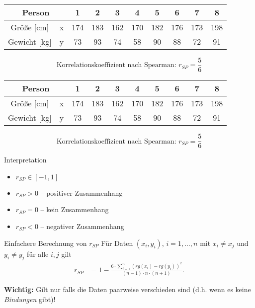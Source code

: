 \documentclass[t,11pt]{beamer}
\begin{document}
\begin{frame}
\begin{tabular}{|cc|cccccccc|}
	\hline
	\multicolumn{2}{|c|}{Person} & 1 & 2 & 3 & 4 & 5 & 6 & 7 & 8 \\
	\hline 
	Größe [cm] & x & 174 & 183 & 162  & 170 & 182 & 176 & 173 & 198  \\ 
	Gewicht [kg] & y &  73 & 93 & 74 & 58 & 90 & 88 & 72 & 91\\ 
	\hline 
\end{tabular}
$$\text{Korrelationskoeffizient nach Spearman: }r_{SP}=\frac{5}{6}$$
\end{frame}

\begin{frame}
\begin{tabular}{|cc|cccccccc|}
	\hline
	\multicolumn{2}{|c|}{Person} & 1 & 2 & 3 & 4 & 5 & 6 & 7 & 8 \\
	\hline 
	Größe [cm] & x & 174 & 183 & 162  & 170 & 182 & 176 & 173 & 198  \\ 
	Gewicht [kg] & y &  73 & 93 & 74 & 58 & 90 & 88 & 72 & 91\\ 
	\hline 
\end{tabular}
$$\text{Korrelationskoeffizient nach Spearman: }r_{SP}=\frac{5}{6}$$
\begin{alertblock}{Interpretation}
	\begin{itemize}
		\item $r_{SP} \in [-1,1]$
		\item $r_{SP}>0$ -- positiver Zusammenhang
		\item $r_{SP}=0$ -- kein Zusammenhang
		\item $r_{SP}<0$ -- negativer Zusammenhang
	\end{itemize}
\end{alertblock}
\end{frame}

\begin{frame}
	\begin{exampleblock}{Einfachere Berechnung von $r_{SP}$}
		Für Daten $(x_i,y_i)$, $i=1,\dots,n$ mit $x_i\neq x_j$ und $y_i\neq y_j$ für alle $i,j$ gilt
		\begin{align*}
			r_{SP}&=1-\frac{6 \cdot \sum_{i=1}^{n} (rg(x_i)-rg(y_i))^2}{(n-1)\cdot n \cdot (n+1)}.
		\end{align*}
	\end{exampleblock}
\vspace{0.5cm}
	\textbf{Wichtig:} Gilt nur falls die Daten paarweise verschieden sind (d.h. wenn es keine \textit{Bindungen} gibt)!
\end{frame}
\end{document}

